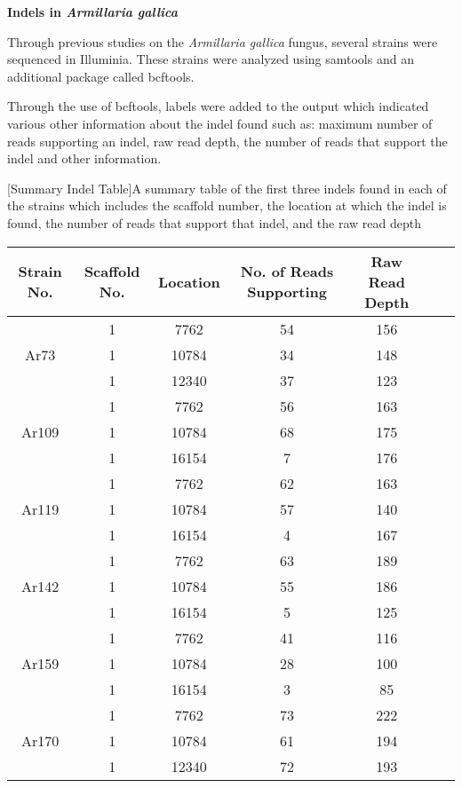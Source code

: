 \documentclass[../main.tex]{subfiles}
\begin{document}
\textbf{Indels in \textit{Armillaria gallica}}

Through previous studies on the \textit{Armillaria gallica} fungus, several strains were sequenced in Illuminia. These strains were analyzed using samtools and an additional package called bcftools. 

Through the use of bcftools, labels were added to the output which indicated various other information about the indel found such as: maximum number of reads supporting an indel, raw read depth, the number of reads that support the indel and other information.


\begin{table}[H]
\begin{center}
	[Summary Indel Table]{A summary table of the first three indels found in each of the strains which includes the scaffold number, the location at which the indel is found, the number of reads that support that indel, and the raw read depth}
	\begin{tabular}{ |c|c|c|c|c|c|c| } 
		\hline
		Strain No. & Scaffold No. & Location & No. of Reads Supporting & Raw Read Depth \\
		\hline
		\multirow{3}{4em}{Ar73} & 1 & 7762 &54 & 156\\
		&1 & 10784 & 34 & 148\\
		&1 & 12340 & 37 & 123\\
		\hline
		\multirow{3}{4em}{Ar109} & 1 & 7762 & 56 & 163\\
		& 1 & 10784 & 68 & 175 \\
		& 1 & 16154 & 7 & 176 \\
		\hline
		\multirow{3}{4em}{Ar119} & 1 & 7762 & 62 & 163 \\
		& 1 & 10784 & 57 & 140 \\
		& 1 & 16154 & 4 & 167 \\
		\hline
		\multirow{3}{4em}{Ar142} & 1 & 7762 & 63 & 189 \\
		& 1 & 10784 & 55 & 186 \\
		& 1 & 16154 & 5 & 125 \\
		\multirow{3}{4em}{Ar159} & 1 & 7762 & 41 & 116 \\ 
		& 1 & 10784 & 28 & 100  \\ 
		& 1 & 16154 & 3 & 85 \\ 
		\hline
		\multirow{3}{4em}{Ar170} & 1 & 7762 & 73 & 222 \\ 
		& 1 & 10784 & 61 & 194  \\ 
		& 1 & 12340 & 72 & 193 \\ 

\end{tabular}
\end{center}
\end{table}
\end{document}
